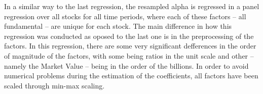 In a similar way to the last regression, the resampled alpha is regressed in a panel regression over all stocks for all time periods, where each of these factors -- all fundamental -- are unique for each stock. The main difference in how this regression was conducted as oposed to the last one is in the preprocessing of the factors. In this regression, there are some very significant defferences in the order of magnitude of the factors, with some being ratios in the unit scale and other -- namely the Market Value -- being in the order of the billions. In order to avoid numerical problems during the estimation of the coefficients, all factors have been scaled through min-max scaling.
